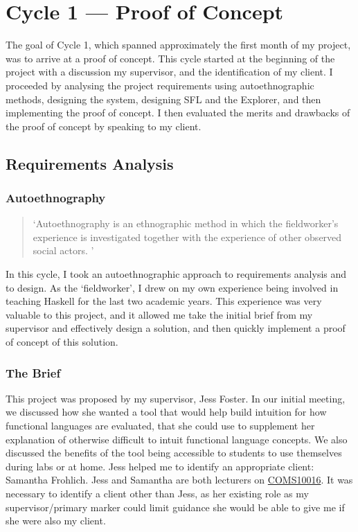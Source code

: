 \chapter{Cycle 1 --- Proof of Concept}
The goal of Cycle 1, which spanned approximately the first month of my project, was to arrive at a proof of concept. This cycle started at the beginning of the project with a discussion my supervisor, and the identification of my client. I proceeded by analysing the project requirements using autoethnographic methods, designing the system, designing \ac{SFL} and the Explorer, and then implementing the proof of concept. I then evaluated the merits and drawbacks of the proof of concept by speaking to my client. 

\section{Requirements Analysis}
\subsection{Autoethnography}
\label{sec:c1_autoethnography}
\begin{quote}
`Autoethnography is an ethnographic method in which the fieldworker's experience is investigated together with the experience of other observed social actors. \cite{autoethnography}'
\end{quote}

\noindent In this cycle, I took an autoethnographic approach to requirements analysis and to design. As the `fieldworker', I drew on my own experience being involved in teaching Haskell for the last two academic years. This experience was very valuable to this project, and it allowed me take the initial brief from my supervisor and effectively design a solution, and then quickly implement a proof of concept of this solution. 

\subsection{The Brief}
This project was proposed by my supervisor, Jess Foster. In our initial meeting, we discussed how she wanted a tool that would help build intuition for how functional languages are evaluated, that she could use to supplement her explanation of otherwise difficult to intuit functional language concepts. We also discussed the benefits of the tool being accessible to students to use themselves during labs or at home. Jess helped me to identify an appropriate client: Samantha Frohlich. Jess and Samantha are both lecturers on \hyperref[COMS10016]{COMS10016}. It was necessary to identify a client other than Jess, as her existing role as my supervisor/primary marker could limit guidance she would be able to give me if she were also my client. 

